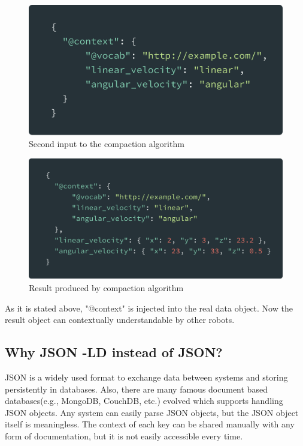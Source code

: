 	\begin{figure}[!htbp] 
		\begin{center}
			\includegraphics[scale=0.1]{./images/png/jsonld/compaction_2}	
			\caption{Second input to the compaction algorithm}	
			\label{fig:jsonld_compaction_2}	
		\end{center}
	\end{figure}
	

	\begin{figure}[!htbp] 
		\begin{center}
			\includegraphics[scale=0.1]{./images/png/jsonld/compaction_3}	
			\caption{Result produced by compaction algorithm}	
			\label{fig:jsonld_compaction_3}	
		\end{center}
	\end{figure}	

	As it is stated above, "@context" is injected into the real data object. Now the result object can contextually understandable by other robots.
		
		
		\subsection{Why JSON -LD instead of JSON?}
		
		JSON is a widely used format to exchange data between systems and storing persistently in databases. Also, there are many famous document based databases(e.g., MongoDB, CouchDB, etc.) evolved which supports handling JSON objects. Any system can easily parse JSON objects, but the JSON object itself is meaningless. The context of each key can be shared manually with any form of documentation, but it is not easily accessible every time.
		
